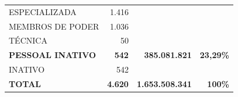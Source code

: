 \documentclass{article}
\begin{document}
\begin{longtable}[c]{m{7cm}|m{2.5cm}|m{2.5cm}|m{2.5cm}}
\multicolumn{1}{L{7cm}|}{ \hspace{3em} ESPECIALIZADA} & \multicolumn{1}{r|}{ 1.416} &  & \\
\multicolumn{1}{L{7cm}|}{ \hspace{3em} MEMBROS DE PODER} & \multicolumn{1}{r|}{ 1.036} &  & \\
\multicolumn{1}{L{7cm}|}{ \hspace{3em} TÉCNICA} & \multicolumn{1}{r|}{    50} &  & \\
\multicolumn{1}{L{7cm}|}{ \textbf{PESSOAL INATIVO}} & \multicolumn{1}{r|}{ \textbf{  542}} & \multicolumn{1}{r|}{ \textbf{  385.081.821}} & \multicolumn{1}{r}{ \textbf{23,29\%}} \\
\multicolumn{1}{L{7cm}|}{ \hspace{3em} INATIVO} & \multicolumn{1}{r|}{   542} &  & \\
\hline \hline 
\multicolumn{1}{L{7cm}|}{ \textbf{TOTAL}} & \multicolumn{1}{r|}{ \textbf{4.620}} & \multicolumn{1}{r|}{ \textbf{1.653.508.341}} & \multicolumn{1}{r}{ \textbf{100\%}} \\
\end{longtable}
\newpage
\small
\end{document}
